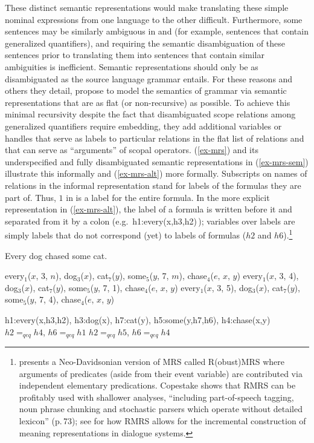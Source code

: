 \documentclass[output=paper
 	        ,biblatex
                ,babelshorthands
                ,newtxmath
                ,draftmode
                ,colorlinks, citecolor=brown
]{langscibook}
\begin{document}
These distinct semantic representations would make translating these simple nominal expressions from one language to the other difficult. Furthermore, some sentences may be similarly ambiguous in  and  (for example, sentences that contain generalized quantifiers), and requiring the semantic disambiguation of these sentences prior to translating them into sentences that contain similar ambiguities is inefficient. Semantic representations should only be as disambiguated as the source language grammar entails. For these reasons and others they detail, \citet{Copestakeetal1995} propose to model the semantics of grammar via semantic representations that are as flat (or non-recursive) as possible. To achieve this minimal recursivity despite the fact that disambiguated scope relations among generalized quantifiers require embedding, they add additional variables or handles that serve as labels to particular relations in the flat list of relations and that can serve as ``arguments'' of scopal operators. (\ref{ex-mrs}) and its underspecified and fully disambiguated semantic representations in (\ref{ex-mrs-sem}) illustrate this informally and (\ref{ex-mrs-alt}) more formally. Subscripts on names of relations in the informal representation stand for labels of the formulas they are part of. Thus, $1$ in  is a label for the entire formula. In the more explicit representation in (\ref{ex-mrs-alt}), the label of a formula is written before it and separated from it by a colon (e.g.\ h1:every(x,h3,h2)\,); 
variables over labels are simply labels that do not correspond (yet) to labels of formulas ($h2$ and $h6$).\footnote{\citet{Copestake2007} presents a Neo-Davidsonian version of MRS called R(obust)MRS where arguments of predicates (aside from their event variable) are contributed via independent elementary predications. Copestake shows that RMRS can be profitably used with shallower analyses, ``including part-of-speech tagging, noun phrase chunking and stochastic parsers which operate without detailed lexicon'' (p.\,73); see \citet{PeldzusandSchlangen2012} for how RMRS allows for the incremental construction of meaning representations in dialogue systems.}

\begin{exe}
\ex\label{ex-mrs}
Every dog chased some cat.
\ex\label{ex-mrs-sem}
\begin{xlist}
\ex\label{ex-mrs-sem-a}
every$_{1}$($x$, 3, $n$), dog$_{3}$($x$), cat$_{7}$($y$), some$_{5}$($y$, 7, $m$), chase$_{4}$($e$, $x$, $y$)
\ex\label{ex-mrs-sem-b}
every$_{1}$($x$, 3, 4), dog$_{3}$($x$), cat$_{7}$($y$), some$_{5}$($y$, 7, 1), chase$_{4}$($e$, $x$, $y$)
\ex\label{ex-mrs-sem-c}
every$_{1}$($x$, 3, 5), dog$_{3}$($x$), cat$_{7}$($y$), some$_{5}$($y$, 7, 4), chase$_{4}$($e$, $x$, $y$)
\end{xlist}
\ex\label{ex-mrs-alt}
\begin{xlist}
\ex\label{ex-mrs-alt-a}
h1:every(x,h3,h2), h3:dog(x), h7:cat(y), h5:some(y,h7,h6), h4:chase(x,y)
\ex\label{ex-mrs-alt-b}
$h2=_{qeq}h4$, $h6=_{qeq}h1$
\ex\label{ex-mrs-alt-c}
$h2=_{qeq}h5$, $h6=_{qeq}h4$
\end{xlist}
\end{exe} 
\end{document}
